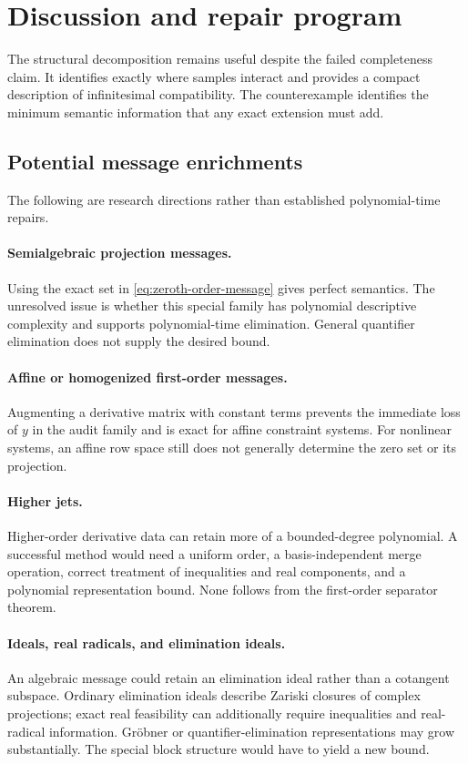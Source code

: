 \section{Discussion and repair program}
\label{sec:discussion}

The structural decomposition remains useful despite the failed completeness
claim.  It identifies exactly where samples interact and provides a compact
description of infinitesimal compatibility.  The counterexample identifies the
minimum semantic information that any exact extension must add.

\subsection{Potential message enrichments}

The following are research directions rather than established polynomial-time
repairs.

\paragraph{Semialgebraic projection messages.}
Using the exact set in \cref{eq:zeroth-order-message} gives perfect semantics.
The unresolved issue is whether this special family has polynomial descriptive
complexity and supports polynomial-time elimination.  General quantifier
elimination does not supply the desired bound.

\paragraph{Affine or homogenized first-order messages.}
Augmenting a derivative matrix with constant terms prevents the immediate loss
of \(y\) in the audit family and is exact for affine constraint systems.  For
nonlinear systems, an affine row space still does not generally determine the
zero set or its projection.

\paragraph{Higher jets.}
Higher-order derivative data can retain more of a bounded-degree polynomial.
A successful method would need a uniform order, a basis-independent merge
operation, correct treatment of inequalities and real components, and a
polynomial representation bound.  None follows from the first-order separator
theorem.

\paragraph{Ideals, real radicals, and elimination ideals.}
An algebraic message could retain an elimination ideal rather than a cotangent
subspace.  Ordinary elimination ideals describe Zariski closures of complex
projections; exact real feasibility can additionally require inequalities and
real-radical information.  Gr\"obner or quantifier-elimination representations
may grow substantially.  The special block structure would have to yield a new
bound.

